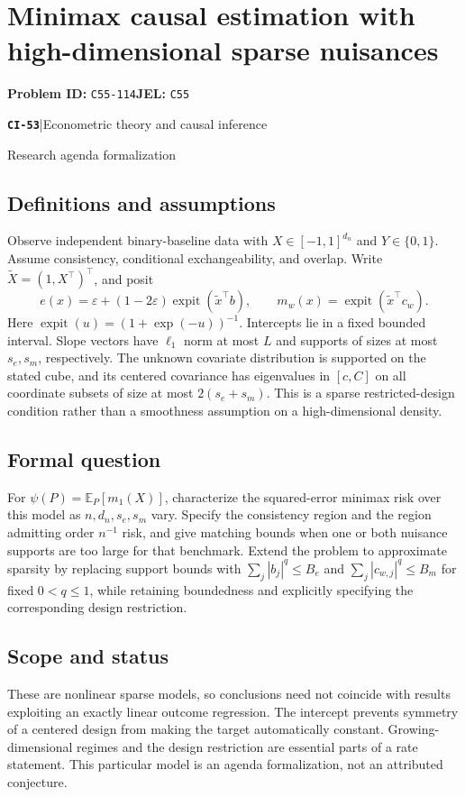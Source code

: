 \documentclass[11pt,a4paper]{article}
\newcommand{\E}{\mathbb E}
\newcommand{\entrymeta}[3]{{\sffamily\small\color{muted}\textbf{\texttt{#1}}\quad|\quad #2\par #3\par}}
\begin{document}
\section*{Minimax causal estimation with high-dimensional sparse nuisances}
\textbf{Problem ID:} \texttt{C55-114}\quad \textbf{JEL:} \texttt{C55}\par
\label{problem:OP-0532}
\label{beyond:CI-53}
\entrymeta{CI-53}{Econometric theory and causal inference}{Research agenda formalization}
\subsection*{Definitions and assumptions}
Observe independent binary-baseline data with $X\in[-1,1]^{d_n}$ and $Y\in\{0,1\}$. Assume consistency, conditional exchangeability, and overlap. Write $\widetilde X=(1,X^\top)^\top$, and posit
\[
 e(x)=\varepsilon+(1-2\varepsilon)
             \operatorname{expit}(\widetilde x^\top b),\qquad
 m_w(x)=\operatorname{expit}(\widetilde x^\top c_w).
\]
Here $\operatorname{expit}(u)=(1+\exp(-u))^{-1}$. Intercepts lie in a fixed bounded interval. Slope vectors have $\ell_1$ norm at most $L$ and supports of sizes at most $s_e,s_m$, respectively. The unknown covariate distribution is supported on the stated cube, and its centered covariance has eigenvalues in $[c,C]$ on all coordinate subsets of size at most $2(s_e+s_m)$. This is a sparse restricted-design condition rather than a smoothness assumption on a high-dimensional density.
\subsection*{Formal question}
For $\psi(P)=\E_P[m_1(X)]$, characterize the squared-error minimax risk over this model as $n,d_n,s_e,s_m$ vary. Specify the consistency region and the region admitting order $n^{-1}$ risk, and give matching bounds when one or both nuisance supports are too large for that benchmark. Extend the problem to approximate sparsity by replacing support bounds with
$\sum_j|b_j|^q\leq B_e$ and $\sum_j|c_{w,j}|^q\leq B_m$ for fixed $0<q\leq1$, while retaining boundedness and explicitly specifying the corresponding design restriction.
\subsection*{Scope and status}
These are nonlinear sparse models, so conclusions need not coincide with results exploiting an exactly linear outcome regression. The intercept prevents symmetry of a centered design from making the target automatically constant. Growing-dimensional regimes and the design restriction are essential parts of a rate statement. This particular model is an agenda formalization, not an attributed conjecture.
\end{document}
